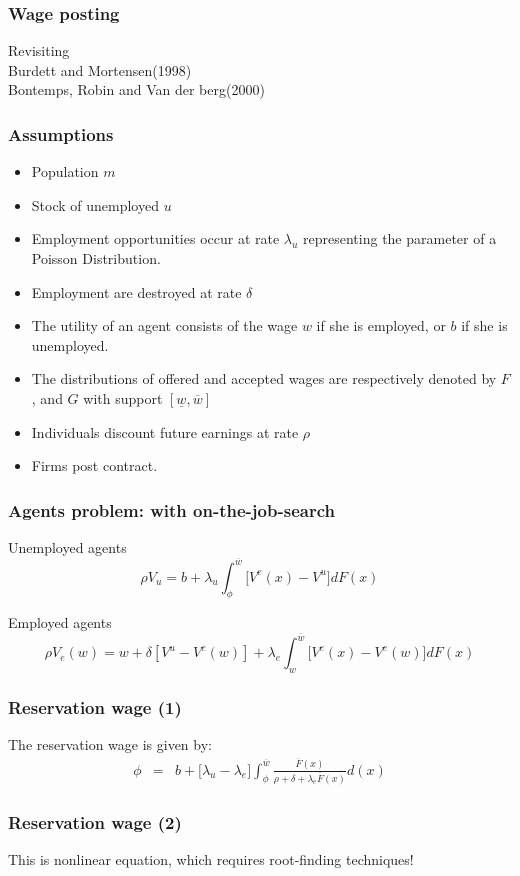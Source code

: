 \documentclass{beamer}
\newcommand{\lau}{\lambda_u}
\newcommand{\lae}{\lambda_e}
\newcommand{\1}{\mathbb{1}}
\newcommand{\ow}{\overline{w}}
\newcommand{\uw}{\underline{w}}
\newcommand{\de}{\delta}
\begin{document}
\begin{frame}\frametitle{Wage posting}
Revisiting \\ Burdett and Mortensen(1998) \\ Bontemps, Robin and Van der berg(2000)
\end{frame}

\begin{frame}\frametitle{Assumptions}
\begin{itemize}
\item Population $m$
\item Stock of unemployed $u$
\item Employment opportunities occur at rate $\lau$ representing the parameter of a Poisson Distribution. 
\item Employment are destroyed at rate $\de$
\item The utility of an agent consists of the wage $w$ if she is employed, or $b$ if she is unemployed. 
\item The distributions of offered and accepted wages are respectively denoted by $F$, and $G$ with support $[\uw,\ow]$
\item Individuals discount future earnings at rate $\rho$
\item Firms post contract. 
\end{itemize}
\end{frame}

\begin{frame}\frametitle{Agents problem: with on-the-job-search}
Unemployed agents
\begin{equation*}
\rho V_u = b + \lau \int_{\phi}^{\overline{w}} \big[V^e(x) -V^u\big] dF(x)  
\end{equation*}

Employed agents
\begin{equation*}
\rho V_e(w) = w + \de[ V^u - V^e(w) ] + \lae \int_{w}^{\overline{w}} \big[V^e(x) -V^e(w)\big] dF(x)  
\end{equation*}
\end{frame}

\begin{frame}\frametitle{Reservation wage (1)}
The reservation wage is given by: 
\begin{eqnarray*}
\phi 
 &=& b + \big[\lau -\lae\big] \int_{\phi}^{\overline{w}} \frac{\overline{F}(x)}{\rho+\delta+\lambda_e\overline{F}(x)}d(x) 
\end{eqnarray*}
\end{frame}

\begin{frame}\frametitle{Reservation wage (2)}
This is nonlinear equation, which requires root-finding techniques!
\end{frame}
\end{document}
